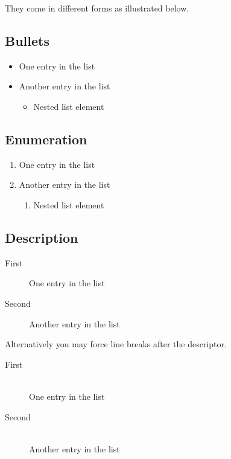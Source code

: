 They come in different forms as illustrated below.

\subsection{Bullets}

\begin{itemize}
	\item One entry in the list
	\item Another entry in the list
	      \begin{itemize}
		      \item Nested list element
	      \end{itemize}
\end{itemize}

\subsection{Enumeration}

\begin{enumerate}
	\item One entry in the list
	\item Another entry in the list
	      \begin{enumerate}
		      \item Nested list element
	      \end{enumerate}
\end{enumerate}

\subsection{Description}

\begin{description}
	\item[First] One entry in the list
	\item[Second] Another entry in the list
\end{description}

Alternatively you may force line breaks after the descriptor.

\begin{description}
	\item[First]\hfill\\
	      One entry in the list
	\item[Second]\hfill\\
	      Another entry in the list
\end{description}

